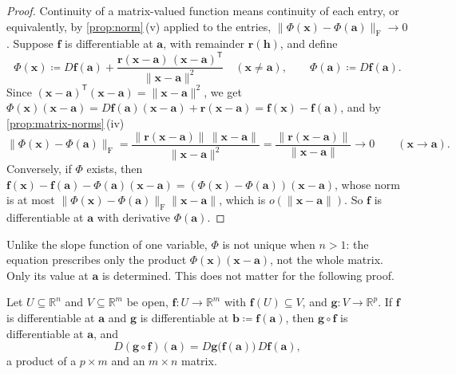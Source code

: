 \begin{proof}
Continuity of a matrix-valued function means continuity of each entry, or equivalently, by \cref{prop:norm}\,(v) applied to the entries, $\|\Phi(\mathbf x)-\Phi(\mathbf a)\|_{\mathrm F}\to0$. Suppose $\mathbf f$ is differentiable at $\mathbf a$, with remainder $\mathbf r(\mathbf h)$, and define
\[
\Phi(\mathbf x)\coloneqq D\mathbf f(\mathbf a)+\frac{\mathbf r(\mathbf x-\mathbf a)\,(\mathbf x-\mathbf a)^{\mathsf T}}{\|\mathbf x-\mathbf a\|^2}\quad(\mathbf x\ne\mathbf a),\qquad\Phi(\mathbf a)\coloneqq D\mathbf f(\mathbf a).
\]
Since $(\mathbf x-\mathbf a)^{\mathsf T}(\mathbf x-\mathbf a)=\|\mathbf x-\mathbf a\|^2$, we get $\Phi(\mathbf x)(\mathbf x-\mathbf a)=D\mathbf f(\mathbf a)(\mathbf x-\mathbf a)+\mathbf r(\mathbf x-\mathbf a)=\mathbf f(\mathbf x)-\mathbf f(\mathbf a)$, and by \cref{prop:matrix-norms}\,(iv)
\[
\|\Phi(\mathbf x)-\Phi(\mathbf a)\|_{\mathrm F}=\frac{\|\mathbf r(\mathbf x-\mathbf a)\|\,\|\mathbf x-\mathbf a\|}{\|\mathbf x-\mathbf a\|^2}=\frac{\|\mathbf r(\mathbf x-\mathbf a)\|}{\|\mathbf x-\mathbf a\|}\to0\qquad(\mathbf x\to\mathbf a).
\]
Conversely, if $\Phi$ exists, then $\mathbf f(\mathbf x)-\mathbf f(\mathbf a)-\Phi(\mathbf a)(\mathbf x-\mathbf a)=(\Phi(\mathbf x)-\Phi(\mathbf a))(\mathbf x-\mathbf a)$, whose norm is at most $\|\Phi(\mathbf x)-\Phi(\mathbf a)\|_{\mathrm F}\|\mathbf x-\mathbf a\|$, which is $o(\|\mathbf x-\mathbf a\|)$. So $\mathbf f$ is differentiable at $\mathbf a$ with derivative $\Phi(\mathbf a)$.
\end{proof}

Unlike the slope function of one variable, $\Phi$ is not unique when $n>1$: the equation prescribes only the product $\Phi(\mathbf x)(\mathbf x-\mathbf a)$, not the whole matrix. Only its value at $\mathbf a$ is determined. This does not matter for the following proof.

\begin{theorem}
\label{thm:chain-rule-rn}
Let $U\subseteq\mathbb R^n$ and $V\subseteq\mathbb R^m$ be open, $\mathbf f\colon U\to\mathbb R^m$ with $\mathbf f(U)\subseteq V$, and $\mathbf g\colon V\to\mathbb R^p$. If $\mathbf f$ is differentiable at $\mathbf a$ and $\mathbf g$ is differentiable at $\mathbf b\coloneqq\mathbf f(\mathbf a)$, then $\mathbf g\circ\mathbf f$ is differentiable at $\mathbf a$, and
\[
D(\mathbf g\circ\mathbf f)(\mathbf a)=D\mathbf g\bigl(\mathbf f(\mathbf a)\bigr)\,D\mathbf f(\mathbf a),
\]
a product of a $p\times m$ and an $m\times n$ matrix.
\end{theorem}

